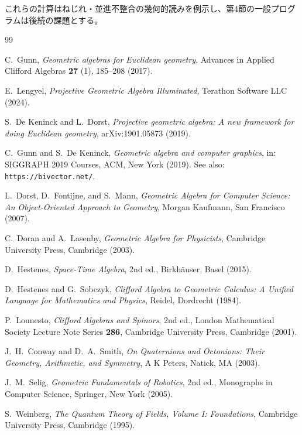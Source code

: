 \documentclass[dvipdfmx,11pt,a4paper]{article}
\theoremstyle{definition}
\theoremstyle{plain}
\theoremstyle{remark}
\begin{document}
これらの計算はねじれ・並進不整合の幾何的読みを例示し、第4節の一般プログラムは後続の課題とする。

\begin{thebibliography}{99}

C.~Gunn,
\textit{Geometric algebras for Euclidean geometry},
Advances in Applied Clifford Algebras \textbf{27} (1), 185--208 (2017).

E.~Lengyel,
\textit{Projective Geometric Algebra Illuminated},
Terathon Software LLC (2024).

S.~De Keninck and L.~Dorst,
\textit{Projective geometric algebra: A new framework for doing Euclidean geometry},
arXiv:1901.05873 (2019).

C.~Gunn and S.~De Keninck,
\textit{Geometric algebra and computer graphics},
in: SIGGRAPH 2019 Courses, ACM, New York (2019).
See also: \texttt{https://bivector.net/}.

L.~Dorst, D.~Fontijne, and S.~Mann,
\textit{Geometric Algebra for Computer Science: An Object-Oriented Approach to Geometry},
Morgan Kaufmann, San Francisco (2007).

C.~Doran and A.~Lasenby,
\textit{Geometric Algebra for Physicists},
Cambridge University Press, Cambridge (2003).

D.~Hestenes,
\textit{Space-Time Algebra}, 2nd ed.,
Birkh\"{a}user, Basel (2015).

D.~Hestenes and G.~Sobczyk,
\textit{Clifford Algebra to Geometric Calculus: A Unified Language for Mathematics and Physics},
Reidel, Dordrecht (1984).

P.~Lounesto,
\textit{Clifford Algebras and Spinors}, 2nd ed.,
London Mathematical Society Lecture Note Series \textbf{286},
Cambridge University Press, Cambridge (2001).

J.~H.~Conway and D.~A.~Smith,
\textit{On Quaternions and Octonions: Their Geometry, Arithmetic, and Symmetry},
A K Peters, Natick, MA (2003).

J.~M.~Selig,
\textit{Geometric Fundamentals of Robotics}, 2nd ed.,
Monographs in Computer Science, Springer, New York (2005).

S.~Weinberg,
\textit{The Quantum Theory of Fields, Volume I: Foundations},
Cambridge University Press, Cambridge (1995).


\end{thebibliography}
\end{document}
